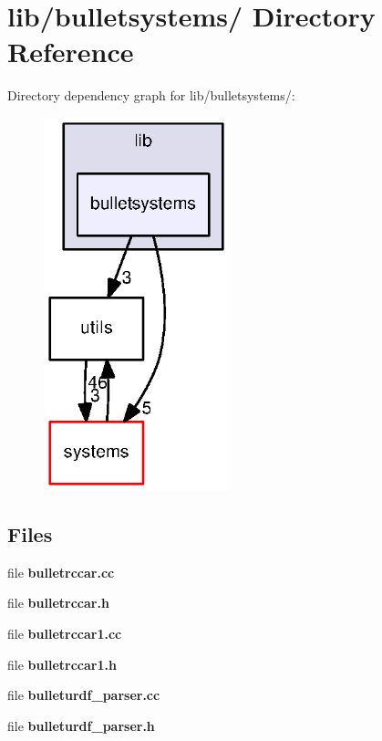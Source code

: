 \section{lib/bulletsystems/ \-Directory \-Reference}
\label{dir_83d75f1047bfcf419bf2ab76bf3143f5}
\-Directory dependency graph for lib/bulletsystems/\-:
\nopagebreak
\begin{figure}[H]
\begin{center}
\leavevmode
\includegraphics[width=152pt]{dir_83d75f1047bfcf419bf2ab76bf3143f5_dep}
\end{center}
\end{figure}
\subsection*{\-Files}
\begin{DoxyCompactItemize}
\item 
file {\bf bulletrccar.\-cc}
\item 
file {\bf bulletrccar.\-h}
\item 
file {\bf bulletrccar1.\-cc}
\item 
file {\bf bulletrccar1.\-h}
\item 
file {\bf bulleturdf\-\_\-parser.\-cc}
\item 
file {\bf bulleturdf\-\_\-parser.\-h}
\end{DoxyCompactItemize}
